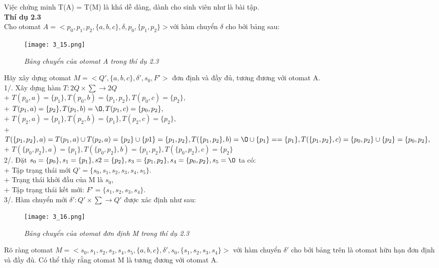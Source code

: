 \begin{flushleft}
Việc chứng minh T(A) = T(M) là khá dễ dàng, dành cho sinh viên như là bài tập.\\
\textbf{Thí dụ 2.3}\\
Cho otomat $A = <{p_0, p_1, p_2}, \{a, b, c\}, \delta , p_0, \{p_1, p_2\}> $với hàm chuyển $\delta$ cho bởi bảng sau:\\
\begin{figure}[ht]
\texttt{[image: 3\_15.png]}
\caption{ \textit{Bảng chuyển của otomat A trong thí dụ 2.3}}
\end{figure}
Hãy xây dựng otomat $M = <Q', \{a, b, c\}, \delta', s_0, F'>$ đơn định và đầy đủ, tương đương với otomat A.\\
\hspace{10mm}1/. Xây dựng hàm $T: 2Q \times \sum \to 2Q$\\
+ $T(p_0, a) = \{p_1\}, T(p_0, b) = \{p_1, p_2\}, T(p_0, c) = \{p_2\},$\\
+ $T(p_1, a) = \{p_2\}, T(p_1, b) = \O , T(p_1, c) = \{p_0, p_2\},$\\
+ $T(p_2, a) = \{p_1\}, T(p_2, b) = \{p_1\}, T(p_2, c) = \{p_2\},$\\
+ $T(\{p_1, p_2\}, a) = T(p_1,a) \cup T(p_2,a) = \{p_2\} \cup\{p1\} = \{p_1, p_2\}, T(\{p_1, p_2\}, b) = \O \cup \{p_1\} = =\{p_1\}, T(\{p_1, p_2\}, c) = \{p_0, p_2\} \cup \{p_2\} = \{p_0, p_2\},$\\
+ $T(\{p_0, p_2\}, a) = \{p_1\}, T(\{p_0, p_2\}, b) = \{p_1, p_2\}, T(\{p_0, p_2\}, c) = \{p_2\}$\\
\hspace{10mm} 2/. Đặt $s_0 = \{p_0\}, s_1 = \{p_1\}, s2 = \{p_2\}, s_3 = \{p_1, p_2\}, s_4 = \{p_0, p_2\}, s_5 = \O$ ta có:\\
+ Tập trạng thái mới $Q’ = \{s_0, s_1, s_2, s_3, s_4, s_5\}.$\\
+ Trạng thái khởi đầu của M là $s_0$,\\
+ Tập trạng thái kết mới: $F' = \{s_1, s_2, s_3, s_4\}.$\\
\hspace{10mm}3/. Hàm chuyển mới $\delta': Q' \times \sum \to Q'$ được xác định như sau:\\
\begin{figure}[ht]
\texttt{[image: 3\_16.png]}
\caption{ \textit{Bảng chuyển của otomat đơn định M trong thí dụ 2.3}}
\end{figure}
Rõ ràng otomat $M = <{s_0, s_1, s_2, s_3, s_4, s_5}, \{a, b, c\}, \delta', s_0, \{s_1, s_2, s_3, s_4\}>$ với hàm chuyển $\delta'$ cho bởi bảng trên là otomat hữu hạn đơn định và đầy đủ. Có thể thây rằng otomat M là tương đương với otomat A.\\

\end{flushleft}
